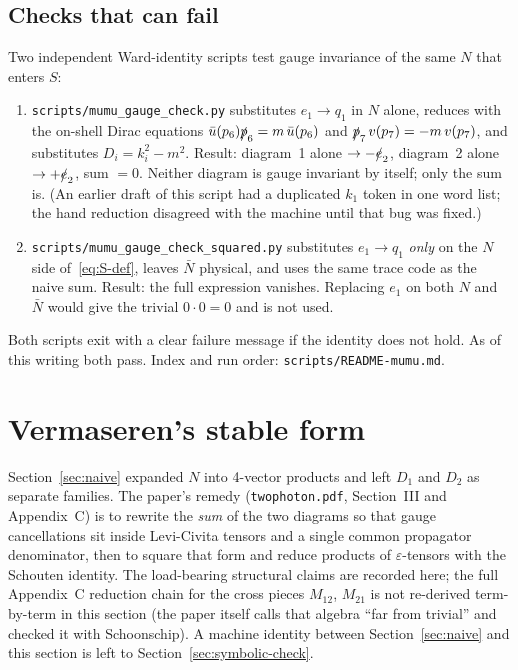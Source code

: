 \documentclass[11pt]{article}
\begin{document}
\subsection{Checks that can fail}
\label{sec:naive-checks}

Two independent Ward-identity scripts test gauge invariance of the same
$N$ that enters $S$:

\begin{enumerate}
  \item \texttt{scripts/mumu\_gauge\_check.py} substitutes $e_1\to q_1$ in
    $N$ alone, reduces with the on-shell Dirac equations
    $\bar u(p_6)\slashed p_6=m\,\bar u(p_6)$ and
    $\slashed p_7\,v(p_7)=-m\,v(p_7)$, and substitutes $D_i=k_i^2-m^2$.
    Result: diagram~1 alone $\to-\slashed e_2$, diagram~2 alone
    $\to+\slashed e_2$, sum $=0$. Neither diagram is gauge invariant by
    itself; only the sum is. (An earlier draft of this script had a
    duplicated $k_1$ token in one word list; the hand reduction disagreed
    with the machine until that bug was fixed.)
  \item \texttt{scripts/mumu\_gauge\_check\_squared.py} substitutes
    $e_1\to q_1$ \emph{only} on the $N$ side of~\eqref{eq:S-def}, leaves
    $\bar N$ physical, and uses the same trace code as the naive sum.
    Result: the full expression vanishes. Replacing $e_1$ on both $N$ and
    $\bar N$ would give the trivial $0\cdot 0=0$ and is not used.
\end{enumerate}
Both scripts exit with a clear failure message if the identity does not
hold. As of this writing both pass. Index and run order:
\texttt{scripts/README-mumu.md}.

\section{Vermaseren's stable form}
\label{sec:stable}

Section~\ref{sec:naive} expanded $N$ into 4-vector products and left
$D_1$ and $D_2$ as separate families. The paper's remedy
(\texttt{twophoton.pdf}, Section~III and Appendix~C) is to rewrite the
\emph{sum} of the two diagrams so that gauge cancellations sit inside
Levi-Civita tensors and a single common propagator denominator, then to
square that form and reduce products of $\varepsilon$-tensors with the
Schouten identity. The load-bearing structural claims are recorded here;
the full Appendix~C reduction chain for the cross pieces $M_{12}$,
$M_{21}$ is not re-derived term-by-term in this section (the paper itself
calls that algebra ``far from trivial'' and checked it with Schoonschip).
A machine identity between Section~\ref{sec:naive} and this section is
left to Section~\ref{sec:symbolic-check}.
\end{document}
